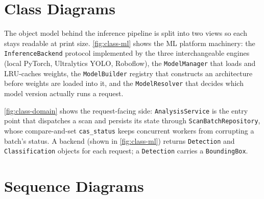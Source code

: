 

\section{Class Diagrams}

The object model behind the inference pipeline is split into two views so
each stays readable at print size. \autoref{fig:class-ml} shows the ML
platform machinery: the \texttt{InferenceBackend} protocol implemented by
the three interchangeable engines (local PyTorch, Ultralytics YOLO,
Roboflow), the \texttt{ModelManager} that loads and LRU-caches weights, the
\texttt{ModelBuilder} registry that constructs an architecture before
weights are loaded into it, and the \texttt{ModelResolver} that decides
which model version actually runs a request.

\autoref{fig:class-domain} shows the request-facing side: \texttt{AnalysisService}
is the entry point that dispatches a scan and persists its state through
\texttt{ScanBatchRepository}, whose compare-and-set \texttt{cas\_status} keeps
concurrent workers from corrupting a batch's status. A backend (shown in
\autoref{fig:class-ml}) returns \texttt{Detection} and \texttt{Classification}
objects for each request; a \texttt{Detection} carries a \texttt{BoundingBox}.



\section{Sequence Diagrams}


